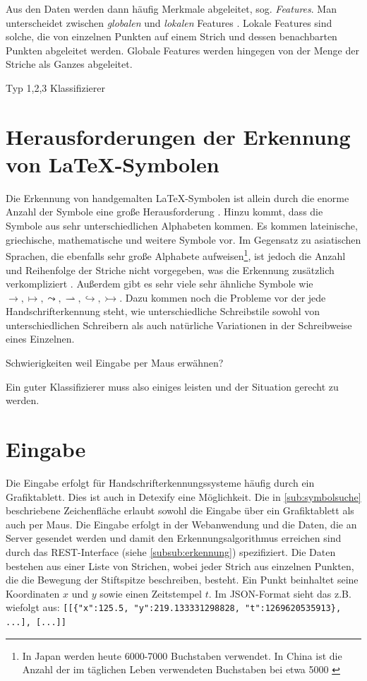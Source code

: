 Aus den Daten werden dann häufig Merkmale abgeleitet, sog. \emph{Features}. Man unterscheidet zwischen \emph{globalen} und \emph{lokalen} Features \cite{Tapia:2007p9160}. Lokale Features sind solche, die von einzelnen Punkten auf einem Strich und dessen benachbarten Punkten abgeleitet werden. Globale Features werden hingegen von der Menge der Striche als Ganzes abgeleitet.

\TODO Typ 1,2,3 Klassifizierer

\section[Herausforderungen]{Herausforderungen der Erkennung von \LaTeX-Symbolen} Die Erkennung von handgemalten \LaTeX-Symbolen ist allein durch die enorme Anzahl der Symbole eine große Herausforderung \cite{Koerich:2003p1562}. Hinzu kommt, dass die Symbole aus sehr unterschiedlichen Alphabeten kommen. Es kommen lateinische, griechische, mathematische und weitere Symbole vor. Im Gegensatz zu asiatischen Sprachen, die ebenfalls sehr große Alphabete aufweisen\footnote{In Japan werden heute 6000-7000 Buchstaben verwendet. In China ist die Anzahl der im täglichen Leben verwendeten Buchstaben bei etwa 5000 \cite{Jaeger:2003p1097}}, ist jedoch die Anzahl und Reihenfolge der Striche nicht vorgegeben, was die Erkennung zusätzlich verkompliziert \cite{Watt:2005p1816}. Außerdem gibt es sehr viele sehr ähnliche Symbole wie $\rightarrow,\mapsto,\leadsto,\rightharpoonup,\hookrightarrow,\rightarrowtail$. Dazu kommen noch die Probleme vor der jede Handschrifterkennung steht, wie unterschiedliche Schreibstile sowohl von unterschiedlichen Schreibern als auch natürliche Variationen in der Schreibweise eines Einzelnen.

\TODO Schwierigkeiten weil Eingabe per Maus erwähnen?

Ein guter Klassifizierer muss also einiges leisten und der Situation gerecht zu werden.

\section{Eingabe} \label{sec:input}

Die Eingabe erfolgt für Handschrifterkennungssysteme häufig durch ein Grafiktablett. Dies ist auch in Detexify eine Möglichkeit. Die in \ref{sub:symbolsuche} beschriebene Zeichenfläche erlaubt sowohl die Eingabe über ein Grafiktablett als auch per Maus. Die Eingabe erfolgt in der Webanwendung und die Daten, die an Server gesendet werden und damit den Erkennungsalgorithmus erreichen sind durch das \ac{REST}-Interface (siehe \ref{subsub:erkennung}) spezifiziert. Die Daten bestehen aus einer Liste von Strichen, wobei jeder Strich aus einzelnen Punkten, die die Bewegung der Stiftspitze beschreiben, besteht. Ein Punkt beinhaltet seine Koordinaten $x$ und $y$ sowie einen Zeitstempel $t$. Im \ac{JSON}-Format sieht das z.B. wiefolgt aus: \lstinline![[{"x":125.5, "y":219.133331298828, "t":1269620535913}, ...], [...]]!

